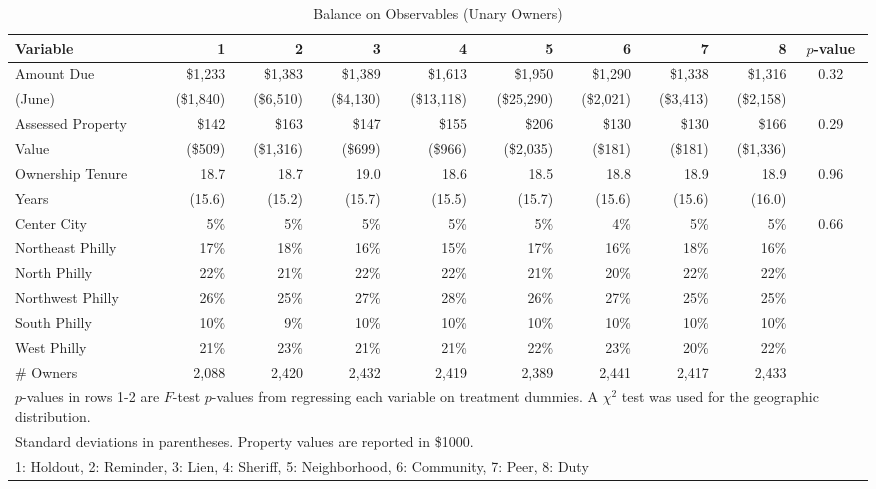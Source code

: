 \documentclass[12pt]{article}
\begin{document}
\begin{sidewaystable}[htbp]
\centering
\caption{Balance on Observables (Unary Owners)}
\label{balance}
\vspace{10mm}
\begin{tabular}{lrrrrrrrrc}
\hline
Variable & 1 & 2 & 3 & 4 & 5 & 6 & 7 & 8 & $p$-value \\
\hline
Amount Due & \$1,233 & \$1,383 & \$1,389 & \$1,613 & \$1,950 & \$1,290 & \$1,338 & \$1,316 & 0.32 \\
(June) & (\$1,840) & (\$6,510) & (\$4,130) & (\$13,118) & (\$25,290) & (\$2,021) & (\$3,413) & (\$2,158) & \\
Assessed Property & \$142 & \$163 & \$147 & \$155 & \$206 & \$130 & \$130 & \$166 & 0.29 \\
Value & (\$509) & (\$1,316) & (\$699) & (\$966) & (\$2,035) & (\$181) & (\$181) & (\$1,336) & \\
Ownership Tenure & 18.7 & 18.7 & 19.0 & 18.6 & 18.5 & 18.8 & 18.9 & 18.9 & 0.96 \\
Years & (15.6) & (15.2) & (15.7) & (15.5) & (15.7) & (15.6) & (15.6) & (16.0) & \\
Center City & 5\% & 5\% & 5\% & 5\% & 5\% & 4\% & 5\% & 5\% & 0.66 \\
Northeast Philly & 17\% & 18\% & 16\% & 15\% & 17\% & 16\% & 18\% & 16\% & \\
North Philly & 22\% & 21\% & 22\% & 22\% & 21\% & 20\% & 22\% & 22\% & \\
Northwest Philly & 26\% & 25\% & 27\% & 28\% & 26\% & 27\% & 25\% & 25\% & \\
South Philly & 10\% & 9\% & 10\% & 10\% & 10\% & 10\% & 10\% & 10\% & \\
West Philly & 21\% & 23\% & 21\% & 21\% & 22\% & 23\% & 20\% & 22\% & \\
\# Owners & 2,088 & 2,420 & 2,432 & 2,419 & 2,389 & 2,441 & 2,417 & 2,433 & \\
\hline
\multicolumn{10}{l}{\scriptsize{$p$-values in rows 1-2 are $F$-test
    $p$-values from regressing each variable on treatment dummies. A
    $\chi^2$ test was used for the geographic distribution.}} \\
\multicolumn{10}{l}{\scriptsize{ Standard deviations in parentheses.
    Property values are reported in \$1000. }} \\
\multicolumn{10}{l}{\scriptsize{1: Holdout, 2: Reminder, 3: Lien, 4: Sheriff,
5: Neighborhood, 6: Community, 7: Peer, 8: Duty}} \\
\end{tabular}
\end{sidewaystable}
\end{document}
